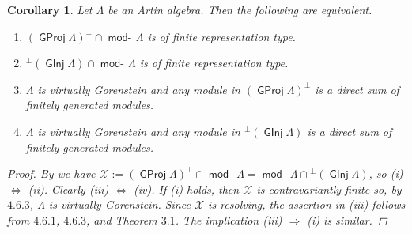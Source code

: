 \documentclass[oneside, a4paper,reqno]{amsart}
\numberwithin{equation}{section}
\newtheorem{cor}[thm]{Corollary}
\theoremstyle{definition}
\begin{document}
\begin{cor} Let $\Lambda$ be an Artin algebra. Then the following
are equivalent.
\begin{enumerate}
\item $({\operatorname{\mathsf{GProj}}\nolimits}\Lambda)^{\bot} \cap \operatorname*{\mathsf{mod}-\!}\Lambda$ is of finite
representation type.
\item ${^{\bot}}({\operatorname{\mathsf{GInj}}\nolimits}\Lambda) \cap \operatorname*{\mathsf{mod}-\!}\Lambda$ is of finite
representation type.
\item $\Lambda$ is virtually Gorenstein and any module in
$({\operatorname{\mathsf{GProj}}\nolimits}\Lambda)^{\bot}$ is a direct sum of finitely generated
modules.
\item $\Lambda$ is virtually Gorenstein and any module in
${^{\bot}}({\operatorname{\mathsf{GInj}}\nolimits}\Lambda)$ is a direct sum of finitely generated
modules.
\end{enumerate}
\begin{proof} By \cite{B:cm} we have ${\mathcal X} := ({\operatorname{\mathsf{GProj}}\nolimits}\Lambda)^{\bot} \cap
\operatorname*{\mathsf{mod}-\!}\Lambda = \operatorname*{\mathsf{mod}-\!}\Lambda \cap {^{\bot}}({\operatorname{\mathsf{GInj}}\nolimits}\Lambda)$, so (i)
$\Leftrightarrow$ (ii). Clearly (iii) $\Leftrightarrow$ (iv). If (i)
holds, then ${\mathcal X}$ is contravariantly finite so, by $4.6.3$, $\Lambda$
is virtually Gorenstein. Since ${\mathcal X}$ is resolving, the assertion in
(iii) follows from $4.6.1$, $4.6.3$, and Theorem $3.1$.  The
implication (iii) $\Rightarrow$ (i) is similar.
\end{proof}
\end{cor}
\end{document}
